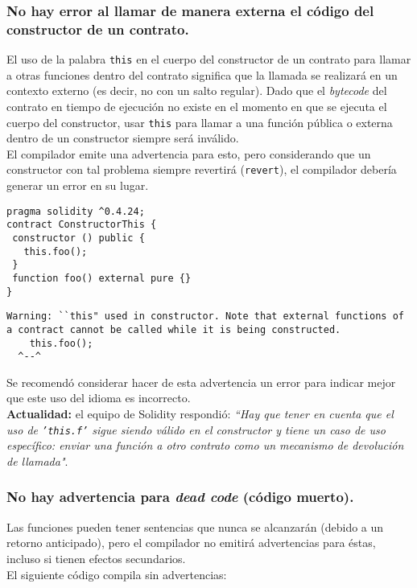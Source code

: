 \subsubsection{No hay error al llamar de manera externa el código del constructor de un contrato.}

El uso de la palabra \texttt{this} en el cuerpo del constructor de un contrato para llamar a otras funciones dentro del contrato significa que la llamada se realizará en un contexto externo (es decir, no con un salto regular). Dado que el \textit{bytecode} del contrato en tiempo de ejecución no existe en el momento en que se ejecuta el cuerpo del constructor, usar \texttt{this} para llamar a una función pública o externa dentro de un constructor siempre será inválido.\\

El compilador emite una advertencia para esto, pero considerando que un constructor con tal problema siempre revertirá (\texttt{revert}), el compilador debería generar un error en su lugar.\\

\begin{lstlisting}[language=Solidity]
pragma solidity ^0.4.24;
contract ConstructorThis {
 constructor () public {
   this.foo();
 }
 function foo() external pure {}
}
\end{lstlisting}

\begin{lstlisting}
Warning: ``this" used in constructor. Note that external functions of a contract cannot be called while it is being constructed.
	this.foo();
  ^--^
\end{lstlisting}  

Se recomendó considerar hacer de esta advertencia un error para indicar mejor que este uso del idioma es incorrecto.\\

\textbf{Actualidad:} el equipo de Solidity respondió: \textit{``Hay que tener en cuenta que el uso de \texttt{'this.f'} sigue siendo válido en el constructor y tiene un caso de uso específico: enviar una función a otro contrato como un mecanismo de devolución de llamada"}.\\

\subsubsection{No hay advertencia para \textit{dead code} (código muerto).}

Las funciones pueden tener sentencias que nunca se alcanzarán (debido a un retorno anticipado), pero el compilador no emitirá advertencias para éstas, incluso si tienen efectos secundarios.\\
 El siguiente código compila sin advertencias:

